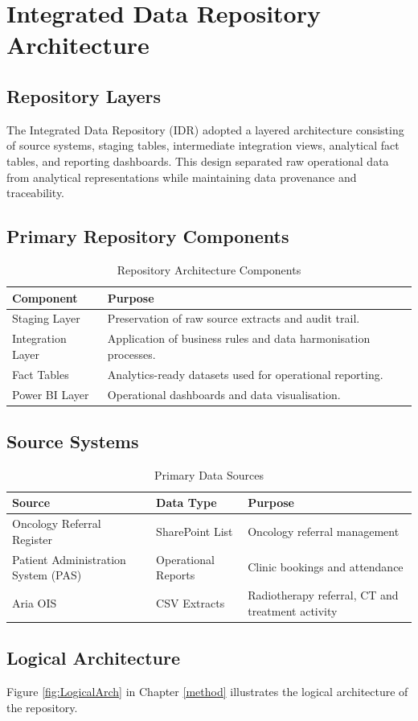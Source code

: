 \chapter{Integrated Data Repository Architecture}\label{appendix:architecture} 
\section{Repository Layers} 

The Integrated Data Repository (IDR) adopted a layered architecture consisting of source systems, staging tables, intermediate integration views, analytical fact tables, and reporting dashboards. This design separated raw operational data from analytical representations while maintaining data provenance and traceability. 

\section{Primary Repository Components} 

\begin{table}[h] 
    \centering 
    \begin{tabular}{|p{4cm}|p{8cm}|} 
        \hline
        \textbf{Component} & \textbf{Purpose} \\ 
        \hline\hline 
        Staging Layer & Preservation of raw source extracts and audit trail. \\ 
        \hline 
        Integration Layer & Application of business rules and data harmonisation processes. \\
        \hline 
        Fact Tables & Analytics-ready datasets used for operational reporting. \\ 
        \hline 
        Power BI Layer & Operational dashboards and data visualisation. \\ 
        \hline 
    \end{tabular} 
    \caption{Repository Architecture Components} 
\end{table} 

\section{Source Systems} 

\begin{table}[h] 
    \centering 
    \begin{tabular}{|p{3cm}|p{4cm}|p{5cm}|} 
        \hline
        \textbf{Source} & \textbf{Data Type} & \textbf{Purpose} \\ 
        \hline\hline
        Oncology Referral Register & SharePoint List & Oncology referral management \\ 
        \hline Patient Administration System (PAS) & Operational Reports & Clinic bookings and attendance \\ 
        \hline 
        Aria OIS & CSV Extracts & Radiotherapy referral, CT and treatment activity \\ 
        \hline 
    \end{tabular} 
    \caption{Primary Data Sources} 
\end{table} 

\section{Logical Architecture} 

Figure \ref{fig:LogicalArch} in Chapter \ref{method} illustrates the logical architecture of the repository.
